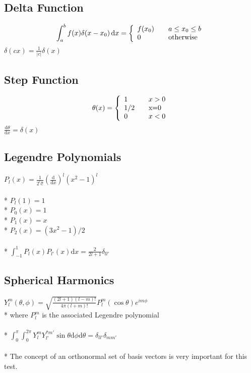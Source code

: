 \subsection{Delta Function}
\[\displaystyle\int_{a}^{b}f(x)\delta(x-x_0)\,\mathrm{d}x = \left\{
\begin{array}{l l}
  f(x_0) & \quad \mbox{\(a\leq x_0\leq b\)}\\
  0 & \quad \mbox{otherwise}\\ \end{array} \right. \]
\(\delta(cx)=\frac{1}{|c|}\delta(x)\)

\subsection{Step Function}
\[\theta(x) = \left\{
\begin{array}{l l}
  1 & \quad \mbox{\(x>0\)}\\
  1/2 & \quad \mbox{x=0}\\
  0 & \quad \mbox{\(x<0\)}\\ \end{array} \right. \]
\(\displaystyle\frac{\mathrm{d}\theta}{\mathrm{d}x}=\delta(x)\)

\subsection{Legendre Polynomials}
\(\displaystyle P_l(x)=\frac{1}{2^ll!}\left(\frac{\mathrm{d}}{\mathrm{d}x}\right)^l\left(x^2-1\right)^l\)\\\\*
\(P_l(1)=1\)\\*
\(P_0(x)=1\)\\*
\(P_1(x)=x\)\\*
\(P_2(x)=(3x^2-1)/2\)\\\\*
\(\displaystyle \int_{-1}^{1}P_l(x)P_{l'}(x)\mathrm{d}x=\frac{2}{2l+1}\delta_{ll'}\)

\subsection{Spherical Harmonics}
\(\displaystyle Y^{m}_{l}\left(\theta,\phi\right)=\sqrt{\frac{(2l+1)(l-m)!}{4\pi(l+m)!}}P_{l}^{m}(\cos{\theta})e^{im\phi}\)\\*
where \(P_{l}^{m}\) is the associated Legendre polynomial\\\\*
\(\displaystyle\int_{0}^{\pi}{\int_{0}^{2\pi}{Y_{l}^{m}Y_{l'}^{*m'}\sin{\theta}\mathrm{d}\phi\mathrm{d}\theta}}=\delta_{ll'}\delta_{mm'}\)\\\\*
The concept of an orthonormal set of basis vectors is very important for this test.

